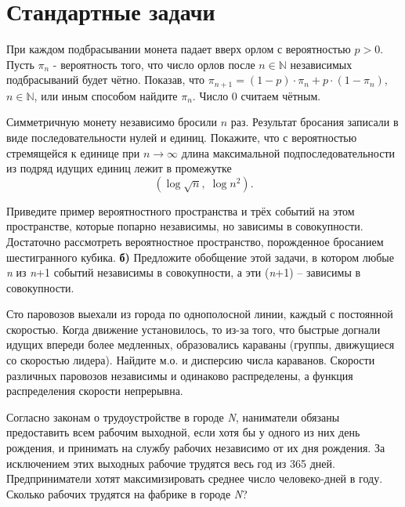 \section{Стандартные задачи}

\begin{problem}
При каждом подбрасывании монета падает вверх орлом с вероятностью $p>0$. Пусть $\pi _{n} $ - вероятность того, что число орлов после $n\in {\mathbb N}$ независимых подбрасываний будет чётно. Показав, что $\pi _{n+1} =\left(1-p\right)\cdot \pi _{n} +p\cdot \left(1-\pi _{n} \right)$, $n\in {\mathbb N}$, или иным способом найдите $\pi _{n} $. Число $0$ считаем чётным.
\end{problem}

\begin{problem}
Симметричную монету независимо бросили $n$ раз. Результат бросания записали в виде последовательности нулей и единиц. Покажите, что с вероятностью стремящейся к единице при $n\to \infty $ длина максимальной подпоследовательности из подряд идущих единиц лежит в промежутке
\[\left(\log \sqrt{n} ,\; \log n^{2} \right).\] 
\end{problem}

\begin{problem}
Приведите пример вероятностного пространства и трёх событий на этом пространстве, которые попарно независимы, но зависимы в совокупности. Достаточно рассмотреть вероятностное пространство, порожденное бросанием шестигранного кубика. \textbf{б) }Предложите обобщение этой задачи, в котором любые \textit{n} из \textit{n}+1 событий независимы в совокупности, а эти (\textit{n}+1) -- зависимы в совокупности.
\end{problem}

\begin{problem}
Сто паровозов выехали из города по однополосной линии, каждый с постоянной скоростью. Когда движение установилось, то из-за того, что быстрые догнали идущих впереди более медленных, образовались караваны (группы, движущиеся со скоростью лидера). Найдите м.о. и дисперсию числа караванов. Скорости различных паровозов независимы и одинаково распределены, а функция распределения скорости непрерывна.
\end{problem}

\begin{problem}
Согласно законам о трудоустройстве в городе \textit{N}, наниматели обязаны предоставить всем рабочим выходной, если хотя бы у одного из них день рождения, и принимать на службу рабочих независимо от их дня рождения. За исключением этих выходных рабочие трудятся весь год из 365 дней. Предприниматели хотят максимизировать среднее число человеко-дней в году. Сколько рабочих трудятся на фабрике в городе \textit{N}?

\end{problem}

